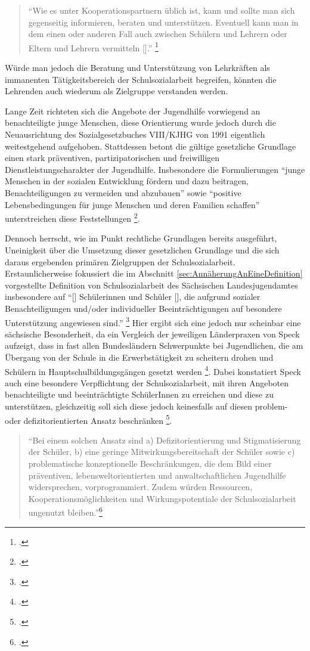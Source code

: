 \begin{quotation}
\noindent
"`Wie es unter Kooperationspartnern üblich ist, kann und sollte man sich gegenseitig informieren, beraten und unterstützen. Eventuell kann man in dem einen oder anderen Fall auch zwischen Schülern und Lehrern oder Eltern und Lehrern vermitteln [\punkte]."' \footcite[vgl.][50]{Spies2011}
\end{quotation}

\noindent
Würde man jedoch die Beratung und Unterstützung von Lehrkräften als immanenten Tätigkeitsbereich der Schulsozialarbeit begreifen, könnten die Lehrenden auch wiederum als Zielgruppe verstanden werden.

Lange Zeit richteten sich die Angebote der Jugendhilfe vorwiegend an benachteiligte junge Menschen, diese Orientierung wurde jedoch durch die Neuausrichtung des Sozialgesetzbuches VIII/KJHG von 1991 eigentlich weitestgehend aufgehoben. Stattdessen betont die gültige gesetzliche Grundlage einen stark präventiven, partizipatorischen und freiwilligen Dienstleistungscharakter der Jugendhilfe. Insbesondere die Formulierungen "`junge Menschen in der sozialen Entwicklung fördern und dazu beitragen, Benachteiligungen zu vermeiden und abzubauen"' sowie "`positive Lebensbedingungen für junge Menschen und deren Familien schaffen"' unterstreichen diese Feststellungen \footcites[vgl.][30f]{Speck2007}[vgl.][46]{Spies2011}. 

Dennoch herrscht, wie im Punkt rechtliche Grundlagen bereits ausgeführt, Uneinigkeit über die Umsetzung dieser gesetzlichen Grundlage und die sich daraus ergebenden primären Zielgruppen der Schulsozialarbeit. Erstaunlicherweise fokussiert die im Abschnitt \ref{sec:AnnäherungAnEineDefinition} vorgestellte Definition von Schulsozialarbeit des Sächsischen Landesjugendamtes insbesondere auf "`[\punkte] Schülerinnen und Schüler [\punkte], die aufgrund sozialer Benachteiligungen und/oder individueller Beeinträchtigungen auf besondere Unterstützung angewiesen sind."' \footcite[10]{SMSSSL2008} Hier ergibt sich eine jedoch nur scheinbar eine sächsische Besonderheit, da ein Vergleich der jeweiligen Länderpraxen von Speck aufzeigt, dass in fast allen Bundesländern Schwerpunkte bei Jugendlichen, die am Übergang von der Schule in die Erwerbstätigkeit zu scheitern drohen und Schülern in Hauptschulbildungsgängen gesetzt werden \footcite[vgl.][19ff]{Speck2007}. Dabei konstatiert Speck auch eine besondere Verpflichtung der Schulsozialarbeit, mit ihren Angeboten benachteiligte und beeinträchtigte SchülerInnen zu erreichen und diese zu unterstützen, gleichzeitig soll sich diese jedoch keinesfalls auf diesen problem- oder defizitorientierten Ansatz beschränken \footcite[vgl.][46]{Speck2007}. 
\begin{quotation}
\noindent
"`Bei einem solchen Ansatz sind a) Defizitorientierung und Stigmatisierung der Schüler, b) eine geringe Mitwirkungsbereitschaft der Schüler sowie c) problematische konzeptionelle Beschränkungen, die dem Bild einer präventiven, lebensweltorientierten und anwaltschaftlichen Jugendhilfe widersprechen, vorprogrammiert. Zudem würden Ressourcen, Kooperationsmöglichkeiten und Wirkungspotentiale der Schulsozialarbeit ungenutzt bleiben."'\footcite[vgl.][46]{Speck2007}
\end{quotation}
 
